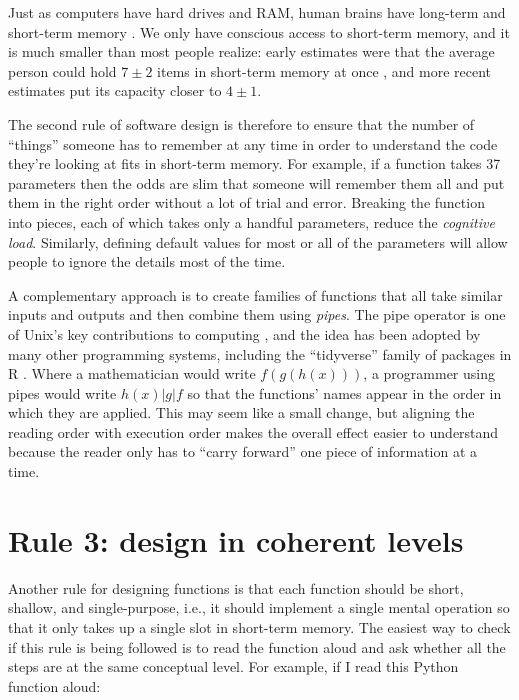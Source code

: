 \documentclass[10pt,letterpaper]{article}
\begin{document}
Just as computers have hard drives and RAM,
human brains have long-term and short-term memory \cite{Hermans2021}.
We only have conscious access to short-term memory,
and it is much smaller than most people realize:
early estimates were that the average person could hold
$7{\pm}2$ items in short-term memory at once \cite{Miller1956},
and more recent estimates put its capacity closer to $4{\pm}1$.

The second rule of software design is therefore
to ensure that the number of ``things'' someone has to remember at any time
in order to understand the code they're looking at
fits in short-term memory.
For example,
if a function takes 37 parameters
then the odds are slim
that someone will remember them all and put them in the right order
without a lot of trial and error.
Breaking the function into pieces,
each of which takes only a handful parameters,
reduce the \emph{cognitive load}.
Similarly,
defining default values for most or all of the parameters
will allow people to ignore the details most of the time.

A complementary approach is to create families of functions
that all take similar inputs and outputs
and then combine them using \emph{pipes}.
The pipe operator is one of Unix's key contributions to computing \cite{Kernighan2019},
and the idea has been adopted by many other programming systems,
including the ``tidyverse'' family of packages in R \cite{Wickham2017}.
Where a mathematician would write $f(g(h(x)))$,
a programmer using pipes would write $h(x) | g | f$
so that the functions' names appear in the order in which they are applied.
This may seem like a small change,
but aligning the reading order with execution order
makes the overall effect easier to understand
because the reader only has to ``carry forward'' one piece of information at a time.

\section*{Rule 3: design in coherent levels}

Another rule for designing functions is that
each function should be short, shallow, and single-purpose,
i.e.,
it should implement a single mental operation
so that it only takes up a single slot in short-term memory.
The easiest way to check if this rule is being followed
is to read the function aloud
and ask whether all the steps are at the same conceptual level.
For example,
if I read this Python function aloud:
\end{document}

